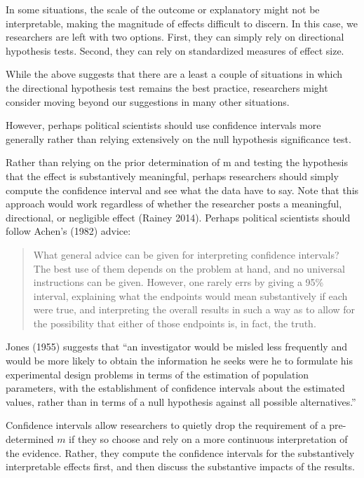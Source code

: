 \documentclass[12pt]{article}
\begin{document}
In some situations, the scale of the outcome or explanatory might not be interpretable, making the magnitude of effects difficult to discern. In this case, we researchers are left with two options. First, they can simply rely on directional hypothesis tests. Second, they can rely on standardized measures of effect size.


While the above suggests that there are a least a couple of situations in which the directional hypothesis test remains the best practice, researchers might consider moving beyond our suggestions in many other situations. 

However, perhaps political scientists should use confidence intervals more generally rather than relying extensively on the null hypothesis significance test.

Rather than relying on the prior determination of m and testing the hypothesis that the effect is substantively meaningful, perhaps researchers should simply compute the confidence interval and see what the data have to say. Note that this approach would work regardless of whether the researcher posts a meaningful, directional, or negligible effect (Rainey 2014). Perhaps political scientists should follow Achen's (1982) advice:

\begin{quote}
What general advice can be given for interpreting confidence intervals? The best use of them depends on the problem at hand, and no universal instructions can be given. However, one rarely errs by giving a 95\% interval, explaining what the endpoints would mean substantively if each were true, and interpreting the overall results in such a way as to allow for the possibility that either of those endpoints is, in fact, the truth.
\end{quote}

Jones (1955) suggests that ``an investigator would be misled less frequently and would be more likely to obtain the information he seeks were he to formulate his experimental design problems in terms of the estimation of population parameters, with the establishment of confidence intervals about the estimated values, rather than in terms of a null hypothesis against all possible alternatives.''

Confidence intervals allow researchers to quietly drop the requirement of a pre-determined $m$ if they so choose and rely on a more continuous interpretation of the evidence. Rather, they compute the confidence intervals for the substantively interpretable effects first, and then discuss the substantive impacts of the results.
\end{document}
